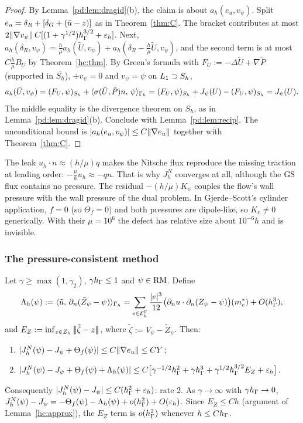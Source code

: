 \begin{proof}
By Lemma~\ref{pd:lem:dragid}(b), the claim is about $a_h(e_u,v_\psi)$. Split $e_u=\delta_R+[\delta_G+(\tilde u-z)]$ as in Theorem~\ref{thm:C}. The bracket contributes at most $2\lVert \nabla v_\psi\rVert\,C[(1+\gamma^{1/2})h_\Gamma^{3/2}+\varepsilon_h]$. Next, $a_h(\delta_R,v_\psi)=\frac h\mu a_h(\tilde U,v_\psi)+a_h(\delta_R-\frac h\mu\tilde U,v_\psi)$, and the second term is at most $C\frac h\mu B_U$ by Theorem~\ref{hc:thm}. By Green's formula with $F_U:=-\Delta\tilde U+\nabla\tilde P$ (supported in $\overline{S_h}$), $\div v_\psi=0$ and $v_\psi=\psi$ on $L_1\supset S_h$,
\[
a_h(\tilde U,v_\psi)=(F_U,\psi)_{S_h}+\langle \sigma(\tilde U,\tilde P)n,\, \psi\rangle_{\Gamma_h}=(F_U,\psi)_{S_h}+J_\psi(U)-(F_U,\psi)_{S_h}=J_\psi(U).
\]
The middle equality is the divergence theorem on $S_h$, as in Lemma~\ref{pd:lem:dragid}(b). Conclude with Lemma~\ref{pd:lem:recip}. The unconditional bound is $|a_h(e_u,v_\psi)|\le C\lVert \nabla e_u\rVert$ together with Theorem~\ref{thm:C}.
\end{proof}

\begin{remark}\label{pd:rem:leakdrag}
The leak $u_h\cdot n\approx(h/\mu)q$ makes the Nitsche flux reproduce the missing traction at leading order: $-\frac\mu hu_h\approx-qn$. That is why $J^N_h$ converges at all, although the $\mathrm{GS}$ flux contains no pressure. The residual $-(h/\mu)K_\psi$ couples the flow's wall pressure with the wall pressure of the dual problem. In Gjerde--Scott's cylinder application, $f=0$ (so $\Theta_f=0$) and both pressures are dipole-like, so $K_e\ne0$ generically. With their $\mu=10^6$ the defect has relative size about $10^{-6}h$ and is invisible.
\end{remark}

\subsubsection{The pressure-consistent method}

\begin{theorem}\label{pd:thm:cnsdrag}
Let $\gamma\ge\max(1,\gamma_2)$, $\gamma h_\Gamma\le1$ and $\psi\in\mathrm{RM}$. Define
\[
\Lambda_h(\psi):=\langle \tilde u,\, \partial_n(\tilde Z_\psi-\psi)\rangle_{\Gamma_h}=\sum_{e\in\mathcal E_h^\Gamma}\frac{|e|^3}{12}\bigl(\partial_n u\cdot\partial_n(Z_\psi-\psi)\bigr)(m_e^\ast)+O(h_\Gamma^3),
\]
and $E_Z:=\inf_{z\in Z_h}|\!|\!|\tilde\zeta-z|\!|\!|$, where $\tilde\zeta:=V_\psi-\tilde Z_\psi$. Then:
\begin{enumerate}[label=(\alph*)]
\item $|J^N_h(\psi)-J_\psi+\Theta_f(\psi)|\le C\lVert \nabla e_u\rVert\le CY$;
\item $|J^N_h(\psi)-J_\psi+\Theta_f(\psi)+\Lambda_h(\psi)|\le C\bigl[\gamma^{-1/2}h_\Gamma^2+\gamma h_\Gamma^3+\gamma^{1/2}h_\Gamma^{3/2}E_Z+\varepsilon_h\bigr]$.
\end{enumerate}
Consequently $|J^N_h(\psi)-J_\psi|\le C(h_\Gamma^2+\varepsilon_h)$: rate $2$. As $\gamma\to\infty$ with $\gamma h_\Gamma\to0$, $J^N_h(\psi)-J_\psi=-\Theta_f(\psi)-\Lambda_h(\psi)+o(h_\Gamma^2)+O(\varepsilon_h)$. Since $E_Z\le Ch$ (argument of Lemma~\ref{hc:approx}), the $E_Z$ term is $o(h_\Gamma^2)$ whenever $h\le Ch_\Gamma$.
\end{theorem}

